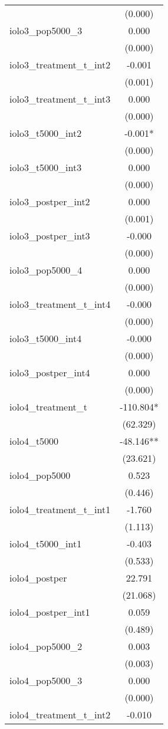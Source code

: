 \documentclass[]{article}
\begin{document}
\begin{tabular}{lc}
 & (0.000) \\
iolo3\_pop5000\_3 & 0.000 \\
 & (0.000) \\
iolo3\_treatment\_t\_int2 & -0.001 \\
 & (0.001) \\
iolo3\_treatment\_t\_int3 & 0.000 \\
 & (0.000) \\
iolo3\_t5000\_int2 & -0.001* \\
 & (0.000) \\
iolo3\_t5000\_int3 & 0.000 \\
 & (0.000) \\
iolo3\_postper\_int2 & 0.000 \\
 & (0.001) \\
iolo3\_postper\_int3 & -0.000 \\
 & (0.000) \\
iolo3\_pop5000\_4 & 0.000 \\
 & (0.000) \\
iolo3\_treatment\_t\_int4 & -0.000 \\
 & (0.000) \\
iolo3\_t5000\_int4 & -0.000 \\
 & (0.000) \\
iolo3\_postper\_int4 & 0.000 \\
 & (0.000) \\
iolo4\_treatment\_t & -110.804* \\
 & (62.329) \\
iolo4\_t5000 & -48.146** \\
 & (23.621) \\
iolo4\_pop5000 & 0.523 \\
 & (0.446) \\
iolo4\_treatment\_t\_int1 & -1.760 \\
 & (1.113) \\
iolo4\_t5000\_int1 & -0.403 \\
 & (0.533) \\
iolo4\_postper & 22.791 \\
 & (21.068) \\
iolo4\_postper\_int1 & 0.059 \\
 & (0.489) \\
iolo4\_pop5000\_2 & 0.003 \\
 & (0.003) \\
iolo4\_pop5000\_3 & 0.000 \\
 & (0.000) \\
iolo4\_treatment\_t\_int2 & -0.010 \\

\end{tabular}
\end{document}
